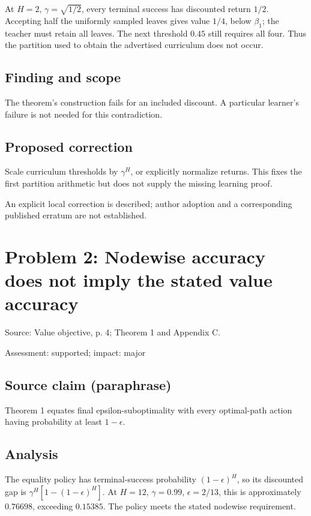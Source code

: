 \documentclass[11pt]{article}
\begin{document}
At \(H=2\), \(\gamma=\sqrt{1/2}\), every terminal success has discounted return \(1/2\). Accepting half the uniformly sampled leaves gives value \(1/4\), below \(\beta_1\); the teacher must retain all leaves. The next threshold \(0.45\) still requires all four. Thus the partition used to obtain the advertised curriculum does not occur.

\subsection*{Finding and scope}

The theorem’s construction fails for an included discount. A particular learner’s failure is not needed for this contradiction.

\subsection*{Proposed correction}

Scale curriculum thresholds by \(\gamma^H\), or explicitly normalize returns. This fixes the first partition arithmetic but does not supply the missing learning proof.

An explicit local correction is described; author adoption and a corresponding published erratum are not established.

\section*{Problem 2: Nodewise accuracy does not imply the stated value accuracy}

Source: Value objective, p. 4; Theorem 1 and Appendix C.

Assessment: supported; impact: major

\subsection*{Source claim (paraphrase)}

Theorem 1 equates final epsilon-suboptimality with every optimal-path action having probability at least \(1-\epsilon\).

\subsection*{Analysis}

The equality policy has terminal-success probability \((1-\epsilon)^H\), so its discounted gap is \(\gamma^H[1-(1-\epsilon)^H]\). At \(H=12\), \(\gamma=0.99\), \(\epsilon=2/13\), this is approximately \(0.76698\), exceeding \(0.15385\). The policy meets the stated nodewise requirement.
\end{document}

